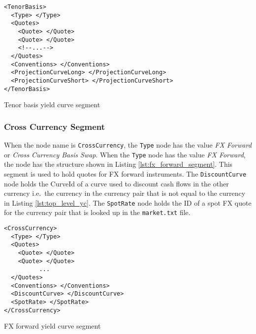 \begin{listing}[H]
\begin{verbatim}
<TenorBasis>
  <Type> </Type>
  <Quotes>
    <Quote> </Quote>
    <Quote> </Quote>
    <!--...-->
  </Quotes>
  <Conventions> </Conventions>
  <ProjectionCurveLong> </ProjectionCurveLong>
  <ProjectionCurveShort> </ProjectionCurveShort>
</TenorBasis>
\end{verbatim}
\caption{Tenor basis yield curve segment}
\label{lst:tenor_basis_segment}
\end{listing}

\subsubsection*{Cross Currency Segment}
When the node name is \lstinline!CrossCurrency!, the \lstinline!Type! node has the value \emph{FX Forward} or
\emph{Cross Currency Basis Swap}. When the \lstinline!Type! node has the value \emph{FX Forward}, the node has the
structure shown in Listing \ref{lst:fx_forward_segment}. This segment is used to hold quotes for FX forward
instruments. The \lstinline!DiscountCurve! node holds the CurveId of a curve used to discount cash flows in the other
currency i.e.\ the currency in the currency pair that is not equal to the currency in Listing
\ref{lst:top_level_yc}. The \lstinline!SpotRate! node holds the ID of a spot FX quote for the currency pair that is
looked up in the {\tt market.txt} file.

\begin{listing}[H]
\begin{verbatim}
<CrossCurrency>
  <Type> </Type>
  <Quotes>
    <Quote> </Quote>
    <Quote> </Quote>
          ...
  </Quotes>
  <Conventions> </Conventions>
  <DiscountCurve> </DiscountCurve>
  <SpotRate> </SpotRate>
</CrossCurrency>
\end{verbatim}
\caption{FX forward yield curve segment}
\label{lst:fx_forward_segment}
\end{listing}

